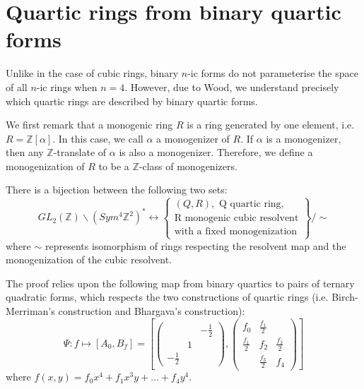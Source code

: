 \documentclass{report}
\begin{document}
\section{Quartic rings from binary quartic forms}

Unlike in the case of cubic rings, binary $n$-ic forms do not parameterise the space of all $n$-ic rings when $n=4$.  However, due to Wood, we understand precisely which quartic rings are described by binary quartic forms.

We first remark that a monogenic ring $R$ is a ring generated by one element, i.e. $R = \mathbb{Z}[\alpha]$.  In this case, we call $\alpha$ a monogenizer of $R$.  If $\alpha$ is a monogenizer, then any $\mathbb{Z}$-translate of $\alpha$ is also a monogenizer.  Therefore, we define a monogenization of $R$ to be a $\mathbb{Z}$-class of monogenizers.

\begin{theorem}[Wood]
There is a bijection between the following two sets:
\begin{equation}
GL_2(\mathbb{Z}) \backslash (Sym^4 \mathbb{Z}^2)^* \leftrightarrow
\left \{
\begin{array}{l}
(Q,R), \text{ Q quartic ring}, \\
\text{R monogenic cubic resolvent} \\
\text{with a fixed monogenization}
\end{array}
\right \} / \sim
\end{equation}
where $\sim$ represents isomorphism of rings respecting the resolvent map and the monogenization of the cubic resolvent.
\end{theorem}

The proof relies upon the following map from binary quartics to pairs of ternary quadratic forms, which respects the two constructions of quartic rings (i.e. Birch-Merriman's construction and Bhargava's construction):
\begin{equation}
\Psi : f \mapsto [A_0, B_f] = \left [
\begin{pmatrix}
& & - \frac{1}{2} \\
& 1 & \\
- \frac{1}{2} & &
\end{pmatrix},
\begin{pmatrix}
f_0 & \frac{f_1}{2} &  \\
\frac{f_1}{2} & f_2 & \frac{f_3}{2} \\
 & \frac{f_3}{2} & f_4
\end{pmatrix} \right ]
\end{equation}
where $f(x,y) = f_0 x^4 + f_1 x^3 y + \ldots + f_4 y^4$.
\end{document}
